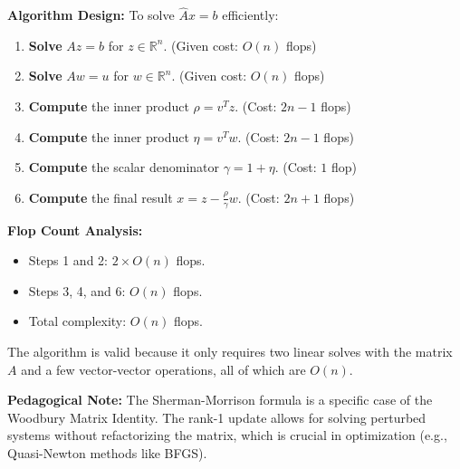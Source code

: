 \begin{solution}
\textbf{Algorithm Design:}
To solve $\widehat{A}x = b$ efficiently:
\begin{enumerate}
    \item \textbf{Solve} $Az = b$ for $z \in \mathbb{R}^n$. (Given cost: $O(n)$ flops)
    \item \textbf{Solve} $Aw = u$ for $w \in \mathbb{R}^n$. (Given cost: $O(n)$ flops)
    \item \textbf{Compute} the inner product $\rho = v^T z$. (Cost: $2n-1$ flops)
    \item \textbf{Compute} the inner product $\eta = v^T w$. (Cost: $2n-1$ flops)
    \item \textbf{Compute} the scalar denominator $\gamma = 1 + \eta$. (Cost: $1$ flop)
    \item \textbf{Compute} the final result $x = z - \frac{\rho}{\gamma} w$. (Cost: $2n+1$ flops)
\end{enumerate}

\textbf{Flop Count Analysis:}
\begin{itemize}
    \item Steps 1 and 2: $2 \times O(n)$ flops.
    \item Steps 3, 4, and 6: $O(n)$ flops.
    \item Total complexity: $O(n)$ flops.
\end{itemize}
The algorithm is valid because it only requires two linear solves with the matrix $A$ and a few vector-vector operations, all of which are $O(n)$.


\textbf{Pedagogical Note:} The Sherman-Morrison formula is a specific case of the Woodbury Matrix Identity. The rank-1 update allows for solving perturbed systems without refactorizing the matrix, which is crucial in optimization (e.g., Quasi-Newton methods like BFGS).

\end{solution}

